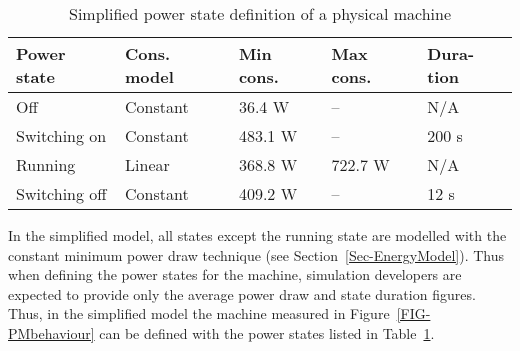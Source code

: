 \documentclass[sort, compress, 5p]{elsarticle}
\begin{document}
\begin{table}[tb]
\centering
\caption{Simplified power state definition of a physical machine\label{TAB-SIMPLI}}
\begin{tabular}{p{2cm}p{1.2cm}p{1.3cm}p{1.3cm}p{0.9cm}}
Power state & Cons. model & Min cons. & Max cons. & Dura-tion \\
\hline
Off & Constant & 36.4 W & -- & N/A\\
Switching on & Constant &483.1 W & -- & 200 s\\
Running & Linear & 368.8 W & 722.7 W & N/A\\
Switching off & Constant & 409.2 W & -- & 12 s\\
\hline
\end{tabular}
\end{table}

In the simplified model, all states except the running state are modelled with the constant minimum power draw technique (see Section~\ref{Sec-EnergyModel}). Thus when defining the power states for the machine, simulation developers are expected to provide only the average power draw and state duration figures. Thus, in the simplified model the machine measured in Figure~\ref{FIG-PMbehaviour} can be defined with the power states listed in Table~\ref{TAB-SIMPLI}.
\end{document}
